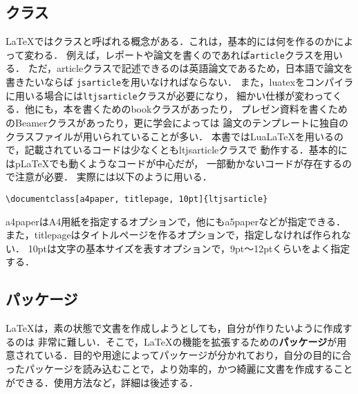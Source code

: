 \subsection{クラス}
\LaTeX ではクラスと呼ばれる概念がある．これは，基本的には何を作るのかによって変わる．
例えば，レポートや論文を書くのであれば\texttt{article}クラスを用いる．
ただ，articleクラスで記述できるのは英語論文であるため，日本語で論文を書きたいならば
\texttt{jsarticle}を用いなければならない．
また，luatexをコンパイラに用いる場合には\texttt{ltjsarticle}クラスが必要になり，
細かい仕様が変わってくる．他にも，本を書くためのbookクラスがあったり，
プレゼン資料を書くためのBeamerクラスがあったり，更に学会によっては
論文のテンプレートに独自のクラスファイルが用いられていることが多い．
本書ではLuaLaTeXを用いるので，記載されているコードは少なくともltjsarticleクラスで
動作する．基本的にはpLaTeXでも動くようなコードが中心だが，
一部動かないコードが存在するので注意が必要．
実際には以下のように用いる．
\begin{lstlisting}
\documentclass[a4paper, titlepage, 10pt]{ltjsarticle}
\end{lstlisting}
a4paperはA4用紙を指定するオプションで，他にもa5paperなどが指定できる．
また，titlepageはタイトルページを作るオプションで，指定しなければ作られない．
10ptは文字の基本サイズを表すオプションで，9pt〜12ptくらいをよく指定する．
\subsection{パッケージ}
\LaTeX は，素の状態で文書を作成しようとしても，自分が作りたいように作成するのは
非常に難しい．そこで，\LaTeX の機能を拡張するための\textbf{パッケージ}が用意されている．目的や用途によってパッケージが分かれており，自分の目的に合ったパッケージを読み込むことで，より効率的，かつ綺麗に文書を作成することができる．使用方法など，詳細は後述する．